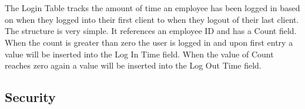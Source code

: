 \documentclass{report}
\begin{document}
        \\
        \\
        The Login Table tracks the amount of time an employee has been logged in based on when
        they logged into their first client to when they logout of their last client. The structure
        is very simple. It references an employee ID and has a Count field. When the count is greater
        than zero the user is logged in and upon first entry a value will be inserted into the
        Log In Time field. When the value of Count reaches zero again a value will be inserted into
        the Log Out Time field.

        \subsection{Security}
\end{document}
